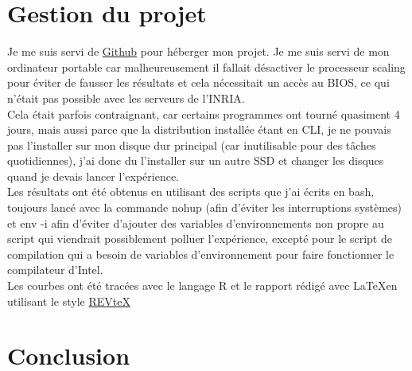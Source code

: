 \documentclass[
 aip,
 jmp,
 amsmath,amssymb,
 reprint
]{revtex4-1}
\begin{document}
\section{Gestion du projet}
Je me suis servi de \href{https://github.com/ingambe/ter/}{Github} pour héberger mon projet. Je me suis servi de mon ordinateur portable car malheureusement il fallait désactiver le processeur scaling pour éviter de fausser les résultats et cela nécessitait un accès au BIOS, ce qui n'était pas possible avec les serveurs de l'INRIA.\\
Cela était parfois contraignant, car certains programmes ont tourné quasiment 4 jours, mais aussi parce que la distribution installée étant en CLI, je ne pouvais pas l'installer sur mon disque dur principal (car inutilisable pour des tâches quotidiennes), j'ai donc du l'installer sur un autre SSD et changer les disques quand je devais lancer l'expérience.\\
Les résultats ont été obtenus en utilisant des scripts que j'ai écrits en bash, toujours lancé avec la commande nohup (afin d'éviter les interruptions systèmes) et  env -i afin d'éviter d'ajouter des variables d'environnements non propre au script qui viendrait possiblement polluer l'expérience, excepté pour le script de compilation qui a besoin de variables d'environnement pour faire fonctionner le compilateur d'Intel.\\
Les courbes ont été tracées avec le langage R et le rapport rédigé avec \LaTeX en utilisant le style  \href{https://journals.aps.org/revtex}{REVteX} 

\section{Conclusion}
\end{document}
